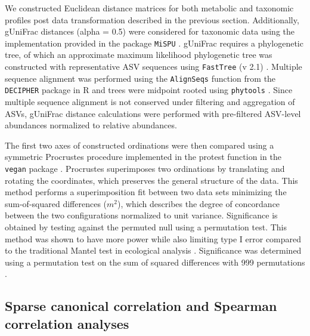 We constructed Euclidean distance matrices for both metabolic and taxonomic profiles post data transformation described in the previous section. Additionally, gUniFrac distances (alpha = 0.5) \cite{chen2012associating} were considered for taxonomic data using the implementation provided in the package \texttt{MiSPU} \cite{wu2016mispu}. gUniFrac requires a phylogenetic tree, of which an approximate maximum likelihood phylogenetic tree was constructed with representative ASV sequences using \texttt{FastTree} (v 2.1) \cite{price2010fasttree}. Multiple sequence alignment was performed using the \texttt{AlignSeqs} function from the \texttt{DECIPHER} package in R \cite{wright2016using} and trees were midpoint rooted using \texttt{phytools} \cite{revell2012phytools}. Since multiple sequence alignment is not conserved under filtering and aggregation of ASVs, gUniFrac distance calculations were performed with pre-filtered ASV-level abundances normalized to relative abundances. 

The first two axes of constructed ordinations were then compared using a symmetric Procrustes procedure implemented in the protest function in the \texttt{vegan} package \cite{oksanen2019vegan}. Procrustes superimposes two ordinations by translating and rotating the coordinates, which preserves the general structure of the data. This method performs a superimposition fit between two data sets minimizing the sum-of-squared differences ($m^2$), which describes the degree of concordance between the two configurations normalized to unit variance. Significance is obtained by testing against the permuted null using a permutation test. This method was shown to have more power while also limiting type I error compared to the traditional Mantel test in ecological analysis \cite{peres-neto2001how}. Significance was determined using a permutation test on the sum of squared differences with 999 permutations \cite{broadhurst2018guidelines}. 

\subsection{Sparse canonical correlation and Spearman correlation analyses}

